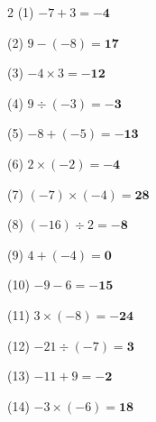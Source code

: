 \documentclass[a4paper, 11pt]{ltjsarticle}
\begin{document}
\hfill


\vspace*{5ex}

\begin{multicols*}{2}
\noindent (1) \quad $-7+3 = \mathbf{-4}$
\vspace*{\fill}

\noindent (2) \quad $9-(-8) = \mathbf{17}$
\vspace*{\fill}

\noindent (3) \quad $-4\times3 = \mathbf{-12}$
\vspace*{\fill}

\noindent (4) \quad $9\div(-3) = \mathbf{-3}$
\vspace*{\fill}

\noindent (5) \quad $-8+(-5) = \mathbf{-13}$
\vspace*{\fill}

\noindent (6) \quad $2\times(-2) = \mathbf{-4}$
\vspace*{\fill}

\noindent (7) \quad $(-7)\times(-4) = \mathbf{28}$
\vspace*{\fill}

\noindent (8) \quad $(-16)\div2 = \mathbf{-8}$
\vspace*{\fill}

\noindent (9) \quad $4+(-4) = \mathbf{0}$
\vspace*{\fill}

\noindent (10) \quad $-9-6 = \mathbf{-15}$
\vspace*{\fill}
\columnbreak

\noindent (11) \quad $3\times(-8) = \mathbf{-24}$
\vspace*{\fill}

\noindent (12) \quad $-21\div(-7) = \mathbf{3}$
\vspace*{\fill}

\noindent (13) \quad $-11+9 = \mathbf{-2}$
\vspace*{\fill}

\noindent (14) \quad $-3\times(-6) = \mathbf{18}$
\vspace*{\fill}


\end{multicols*}
\end{document}
